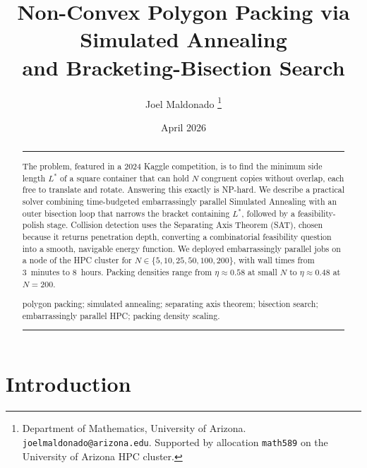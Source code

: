 \documentclass[10pt]{article}
\title{%
  \Large\bfseries
  Non-Convex Polygon Packing via Simulated Annealing\\[4pt]
  and Bracketing-Bisection Search%
}
\author{%
  Joel Maldonado%
  \thanks{Department of Mathematics, University of Arizona.
    \texttt{joelmaldonado@arizona.edu}.
    Supported by allocation \texttt{math589} on the
    University of Arizona HPC cluster.}%
}
\date{April 2026}
\begin{document}
\maketitle
\thispagestyle{firstpage}

\begin{abstract}
\vspace{-2pt}
\noindent\rule{\linewidth}{0.4pt}\vspace{4pt}

\enspace\small
The problem, featured in a 2024
Kaggle competition, is to find the minimum side length $L^*$ of a
square container that can hold $N$ congruent copies without overlap,
each free to translate and rotate. Answering this exactly is NP-hard.
We describe a practical solver combining time-budgeted embarrassingly parallel
 Simulated
Annealing with an outer bisection loop that narrows the bracket
containing $L^*$, followed by a
feasibility-polish stage. Collision detection uses the Separating Axis
Theorem (SAT), chosen because it returns penetration depth, converting
a combinatorial feasibility question into a smooth, navigable energy
function. We deployed embarrassingly parallel jobs on a node of the
HPC cluster for $N \in \{5, 10, 25, 50, 100, 200\}$, with wall times
from 3~minutes to 8~hours. Packing densities range from
$\eta \approx 0.58$ at small $N$ to $\eta \approx 0.48$ at $N = 200$.

\vspace{5pt}
\enspace\small
polygon packing; simulated annealing; separating axis theorem;
bisection search; embarrassingly parallel HPC; packing density scaling.

\vspace{4pt}
\noindent\rule{\linewidth}{0.4pt}\vspace{2pt}
\end{abstract}

\section{Introduction}
\label{sec:intro}
\end{document}
